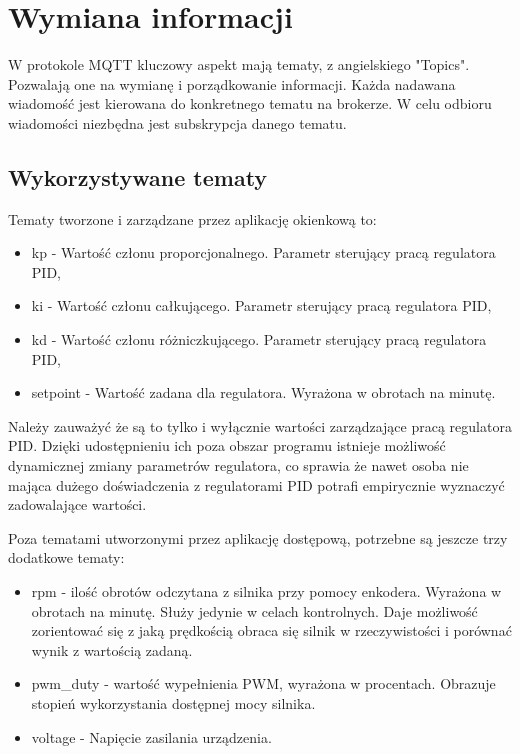  
    \section{Wymiana informacji}
        
        W protokole MQTT kluczowy aspekt mają tematy, z angielskiego "Topics". Pozwalają one na wymianę i porządkowanie informacji. Każda nadawana wiadomość jest kierowana do konkretnego tematu na brokerze. W celu odbioru wiadomości niezbędna jest subskrypcja danego tematu.

    \subsection{Wykorzystywane tematy}
        Tematy tworzone i zarządzane przez aplikację okienkową to:
    
        \begin{itemize}
          \item kp - Wartość członu proporcjonalnego. Parametr sterujący pracą regulatora PID,
          \item ki - Wartość członu całkującego. Parametr sterujący pracą regulatora PID,
          \item kd - Wartość członu różniczkującego. Parametr sterujący pracą regulatora PID, 
          \item setpoint - Wartość zadana dla regulatora. Wyrażona w obrotach na minutę. 
        \end{itemize}
    
        Należy zauważyć że są to tylko i wyłącznie wartości zarządzające pracą regulatora PID. Dzięki udostępnieniu ich poza obszar programu istnieje możliwość dynamicznej zmiany parametrów regulatora, co sprawia że nawet osoba nie mająca dużego doświadczenia z regulatorami PID potrafi empirycznie wyznaczyć zadowalające wartości. 
        
        \vspace{1em} 
        Poza tematami utworzonymi przez aplikację dostępową, potrzebne są jeszcze trzy dodatkowe tematy:
    
        \begin{itemize}
          \item rpm - ilość obrotów odczytana z silnika przy pomocy enkodera. Wyrażona w obrotach na minutę. Służy jedynie w celach kontrolnych. Daje możliwość zorientować się z jaką prędkością obraca się silnik w rzeczywistości i porównać wynik z wartością zadaną.
          
          \item pwm\_duty - wartość wypełnienia PWM, wyrażona w procentach. Obrazuje stopień wykorzystania dostępnej mocy silnika.
          
          \item voltage - Napięcie zasilania urządzenia. 
          
        \end{itemize}
        

